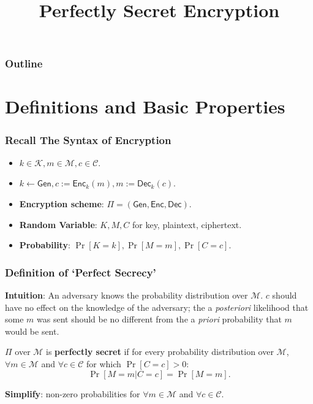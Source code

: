 

\title{Perfectly Secret Encryption}


\maketitle
\begin{frame}\frametitle{Outline}
\tableofcontents
\end{frame}
\section{Definitions and Basic Properties}
\begin{frame}\frametitle{Recall The Syntax of Encryption}
\begin{figure}
\begin{center}

\end{center}
\end{figure}
\begin{itemize}
\item $k \in \mathcal{K}, m \in \mathcal{M}, c \in \mathcal{C}$.
\item $k \gets \mathsf{Gen}, c:= \mathsf{Enc}_k(m), m:= \mathsf{Dec}_k(c)$.
\item \textbf{Encryption scheme}: $\Pi = (\mathsf{Gen}, \mathsf{Enc}, \mathsf{Dec})$.
\item \textbf{Random Variable}: $K, M, C$ for key, plaintext, ciphertext.
\item \textbf{Probability}: $\Pr[K=k], \Pr[M=m], \Pr[C=c].$
\end{itemize}
\end{frame}
\begin{frame}\frametitle{Definition of `Perfect Secrecy'}
\textbf{Intuition}: An adversary knows the probability distribution over $\mathcal{M}$. $c$ should have no effect on the knowledge of the adversary; the a \emph{posteriori} likelihood that some $m$ was sent should be no different from the a \emph{priori} probability that $m$ would be sent. 
\begin{definition}
$\Pi$ over $\mathcal{M}$ is \textbf{perfectly secret} if for every probability distribution over $\mathcal{M}$, $\forall m \in \mathcal{M}$ and $\forall c \in \mathcal{C}$ for which $\Pr[C = c] > 0$:
\[ \Pr[M=m | C=c] = \Pr[M=m].\]
\end{definition}
\textbf{Simplify}: non-zero probabilities for $\forall m \in \mathcal{M}$ and $\forall c \in \mathcal{C}$.
\end{frame}
